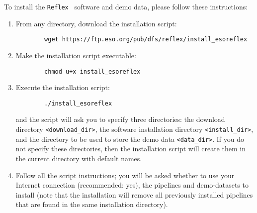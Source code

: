 To install the {\tt Reflex } software and demo data, 
please follow these instructions:
\begin{enumerate}
  \item From any directory, download the installation script:
        {\small
        \begin{verbatim}
        wget https://ftp.eso.org/pub/dfs/reflex/install_esoreflex
        \end{verbatim}
        }

  \item Make the installation script executable:
        {\small
        \begin{verbatim}
        chmod u+x install_esoreflex
        \end{verbatim}
        }

  \item Execute the installation script:
        {\small
        \begin{verbatim}
        ./install_esoreflex
        \end{verbatim}
        }
        and the script will ask you to specify three directories: the download
        directory {\tt \verb|<|download\_dir\verb|>|}, the software
        installation directory {\tt \verb|<|install\_dir\verb|>|}, 
        and the directory to be used to store the demo data 
        {\tt \verb|<|data\_dir\verb|>|}.
        If you do not specify these directories, then the installation script 
        will create them in the current directory with default names.
        
      \item Follow all the script instructions; you will be asked
        whether to use your Internet connection (recommended: yes),
        the pipelines and demo-datasets to install (note that the
        installation will remove all previously installed pipelines
        that are found in the same installation directory).




\end{enumerate}
